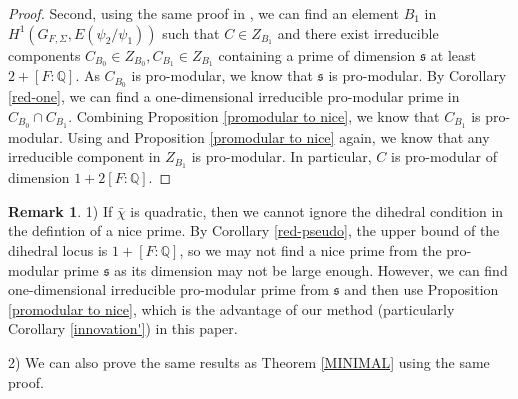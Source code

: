 \documentclass[12pt]{amsart}
\theoremstyle{plain}
\theoremstyle{definition}
\newtheorem{rem}[thm]{Remark}
\theoremstyle{remark}
\begin{document}
\begin{proof}
	Second, using the same proof in \cite[Step (2), page 1154 \& 1155]{pan2022fontaine}, we can find an element $B_1 $ in $H^1(G_{F,\Sigma},E(\psi_2/\psi_1)) $ such that $C \in Z_{B_1}$ and	there exist irreducible components $C_{B_0}\in Z_{B_0}, C_{B_1}\in Z_{B_1}$ containing a prime of dimension $\mathfrak{s}$ at least $2+[F: \mathbb{Q}]$. As $C_{B_0} $ is pro-modular, we know that $\mathfrak{s}$ is pro-modular. By Corollary \ref{red-one}, we can find a one-dimensional irreducible pro-modular prime in $C_{B_0} \cap C_{B_1} $. Combining Proposition \ref{promodular to nice}, we know that $C_{B_1} $ is pro-modular. Using \cite[Corollary 7.4.13]{pan2022fontaine} and Proposition \ref{promodular to nice} again, we know that any irreducible component in  $Z_{B_1}$ is pro-modular. In particular, $C$ is pro-modular of dimension $1+2[F:\mathbb{Q}]$.
\end{proof}

\begin{rem}\label{adv}
	1) If $\bar{\chi}$ is quadratic, then we cannot ignore the dihedral condition in the defintion of a nice prime. By Corollary \ref{red-pseudo}, the upper bound of the dihedral locus is $1+[F: \mathbb{Q}]$, so we may not find a nice prime from the pro-modular prime $\mathfrak{s}$ as its dimension may not be large enough. However, we can find one-dimensional irreducible pro-modular prime from $\mathfrak{s} $ and then use Proposition \ref{promodular to nice}, which is the advantage of our method (particularly Corollary \ref{innovation'}) in this paper.
	
	2) We can also prove the same results as Theorem \ref{MINIMAL} using the same proof.
\end{rem}

\newpage
\end{document}
